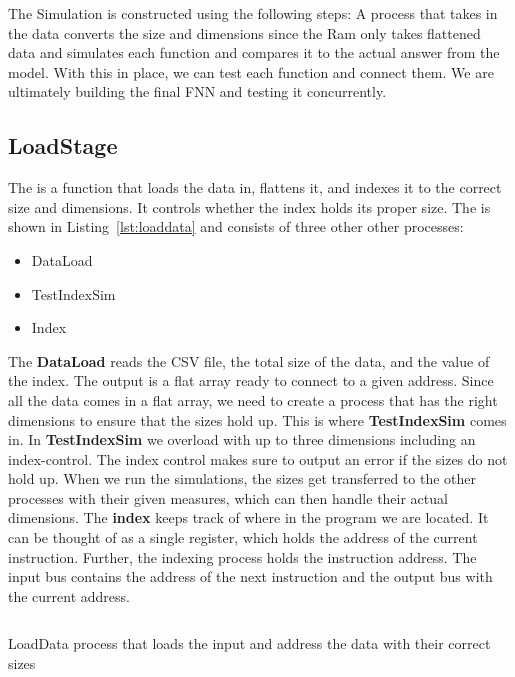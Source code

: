 The Simulation is constructed using the following steps: A process that takes in the data converts the size and dimensions since the Ram only takes flattened data and simulates each function and compares it to the actual answer from the model.
With this in place, we can test each function and connect them. We are ultimately building the final FNN and testing it concurrently.

\subsection{LoadStage}
The  is a function that loads the data in, flattens it, and indexes it to the correct size and dimensions. It controls whether the index holds its proper size.
The  is shown in Listing~\ref{lst:loaddata} and consists of three other other processes:
\begin{itemize}
    \item DataLoad
    \item TestIndexSim
    \item Index
\end{itemize}

The \textbf{DataLoad }reads the CSV file, the total size of the data, and the value of the index. The output is a flat array ready to connect to a given address.
Since all the data comes in a flat array, we need to create a process that has the right dimensions to ensure that the sizes hold up. This is where \textbf{TestIndexSim} comes in. 
In \textbf{TestIndexSim} we overload with up to three dimensions including an index-control. The index control makes sure to output an error if the sizes do not hold up.
When we run the simulations, the sizes get transferred to the other processes with their given measures, which can then handle their actual dimensions.
The \textbf{index} keeps track of where in the program we are located. It can be thought of as a single register, which holds the address of the current instruction.
Further, the indexing process holds the instruction address. The input bus contains the address of the next instruction and the output bus with the current address.

\begin{listing}
  \inputminted{csharp}{codesnippets/loaddata.cs}
  \caption{LoadData process that loads the input and address the data with their correct sizes}
  \label{lst:loaddata}
\end{listing}

